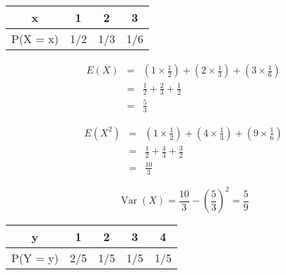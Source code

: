 \documentclass[a4paper,12pt]{article}
\begin{document}
	\begin{center}
		\begin{tabular}{|c|c|c|c|} \hline
			x & 1 & 2 & 3 \\ \hline
			P(X = x) & 1/2 & 1/3 & 1/6 \\ \hline
		\end{tabular}
	\end{center}
	
	\begin{eqnarray*}
		E(X) &=& \left(  1 \times  \frac{1}{2} \right) +  \left( 2 \times    \frac{1}{3} \right) +  \left( 3 \times   \frac{1}{6} \right) \\
		&=& \frac{1}{2} + \frac{2}{3} + \frac{1}{2} \\
		&=& \frac{5}{3}
	\end{eqnarray*}
	
	\begin{eqnarray*}
		E(X^2) &=& \left(  1 \times  \frac{1}{2} \right) +  \left( 4 \times    \frac{1}{3} \right) +  \left( 9 \times   \frac{1}{6} \right) \\
		&=& \frac{1}{2} + \frac{4}{3} + \frac{3}{2} \\
		&=& \frac{10}{3}
	\end{eqnarray*}
	
	\[ \operatorname{Var}(X) = \frac{10}{3} - \left( \frac{5}{3} \right)^2 = \frac{5}{9}\]
	
	\medskip
	
	\begin{center}
		\begin{tabular}{|c|c|c|c|c|} \hline
			y & 1 & 2 & 3 & 4\\ \hline
			P(Y = y) & 2/5 & 1/5 & 1/5& 1/5 \\ \hline
		\end{tabular}
	\end{center}
	
\end{document}
